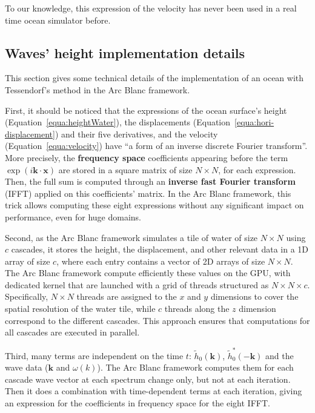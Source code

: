 \documentclass[final]{jcgt}
\def\Framework{The Arc Blanc framework\xspace}
\def\framework{the Arc Blanc framework\xspace}
\begin{document}
To our knowledge, this expression of the velocity has never been used in a real time ocean simulator before.

\subsection{Waves' height implementation details}
This section gives some technical details of the implementation of an ocean with Tessendorf's method in \framework.

First, it should be noticed that the expressions of the ocean surface's height (Equation~\ref{equa:heightWater}), the displacements (Equation~\ref{equa:hori-displacement}) and their five derivatives, and the velocity (Equation~\ref{equa:velocity}) have “a form of an inverse discrete Fourier transform”.
More precisely, the \textbf{frequency space} coefficients appearing before the term $\exp(i\mathbf{k}\cdot\mathbf x)$ are stored in a square matrix of size $N\times N$, for each expression.
Then, the full sum is computed through an \textbf{inverse fast Fourier transform} (IFFT) applied on this coefficients' matrix.
In \framework, this trick allows computing these eight expressions without any significant impact on performance, even for huge domains.

Second, as \framework simulates a tile of water of size $N\times N$ using $c$ cascades, it stores the height, the displacement, and other relevant data in a 1D array of size $c$, where each entry contains a vector of 2D arrays of size $N\times N$. \Framework compute efficiently these values on the GPU, with dedicated kernel that are launched with a grid of threads structured as $N \times N \times c$. Specifically, $N \times N$ threads are assigned to the $x$ and $y$ dimensions to cover the spatial resolution of the water tile, while $c$ threads along the $z$ dimension correspond to the different cascades. This approach ensures that computations for all cascades are executed in parallel.

Third, many terms are independent on the time $t$: $\tilde{h}_0(\mathbf{k})$, $\tilde{h}_0^*(-\mathbf{k})$ and the wave data ($\mathbf{k}$ and $\omega(k)$).
\Framework computes them for each cascade wave vector at each spectrum change only, but not at each iteration.
Then it does a combination with time-dependent terms at each iteration, giving an expression for the coefficients in frequency space for the eight IFFT.
\end{document}
